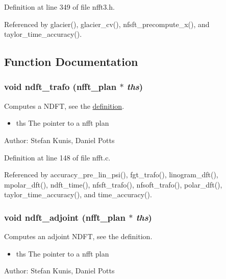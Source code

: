 Definition at line 349 of file nfft3.h.

Referenced by glacier(), glacier\_\-cv(), nfsft\_\-precompute\_\-x(), and taylor\_\-time\_\-accuracy().

\subsection{Function Documentation}
\hypertarget{group__nfft_g27ef1bcb8dd3a3fc1cdbeee368ec1acf}{
\subsubsection{\setlength{\rightskip}{0pt plus 5cm}void ndft\_\-trafo ({\bf nfft\_\-plan} $\ast$ {\em ths})}}
\label{group__nfft_g27ef1bcb8dd3a3fc1cdbeee368ec1acf}


Computes a NDFT, see the \hyperlink{group__nfft_ndft_formula}{definition}. 

\begin{itemize}
\item ths The pointer to a nfft plan\end{itemize}
\begin{Desc}
\item[Author:]Stefan Kunis, Daniel Potts \end{Desc}


Definition at line 148 of file nfft.c.

Referenced by accuracy\_\-pre\_\-lin\_\-psi(), fgt\_\-trafo(), linogram\_\-dft(), mpolar\_\-dft(), ndft\_\-time(), nfsft\_\-trafo(), nfsoft\_\-trafo(), polar\_\-dft(), taylor\_\-time\_\-accuracy(), and time\_\-accuracy().\hypertarget{group__nfft_g03975608fdf8cfd8757f1f52b43ec51b}{
\subsubsection{\setlength{\rightskip}{0pt plus 5cm}void ndft\_\-adjoint ({\bf nfft\_\-plan} $\ast$ {\em ths})}}
\label{group__nfft_g03975608fdf8cfd8757f1f52b43ec51b}


Computes an adjoint NDFT, see the definition. 

\begin{itemize}
\item ths The pointer to a nfft plan\end{itemize}
\begin{Desc}
\item[Author:]Stefan Kunis, Daniel Potts \end{Desc}


